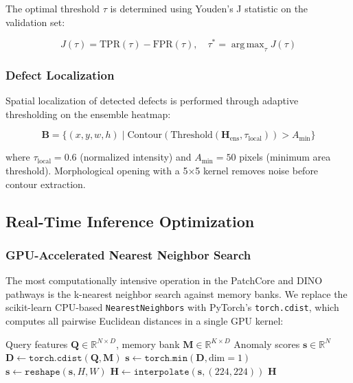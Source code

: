 \documentclass[journal]{IEEEtran}
\DeclareMathOperator*{\argmax}{arg\,max}
\begin{document}
The optimal threshold $\tau$ is determined using Youden's J statistic on the validation set:

\begin{equation}
    J(\tau) = \text{TPR}(\tau) - \text{FPR}(\tau), \quad \tau^* = \argmax_{\tau} J(\tau)
    \label{eq:youden}
\end{equation}

\subsubsection{Defect Localization}

Spatial localization of detected defects is performed through adaptive thresholding on the ensemble heatmap:

\begin{equation}
    \mathbf{B} = \{(x, y, w, h) \;|\; \text{Contour}(\text{Threshold}(\mathbf{H}_{\text{ens}}, \tau_{\text{local}})) > A_{\text{min}}\}
    \label{eq:bboxes}
\end{equation}

where $\tau_{\text{local}} = 0.6$ (normalized intensity) and $A_{\text{min}} = 50$ pixels (minimum area threshold). Morphological opening with a 5$\times$5 kernel removes noise before contour extraction.

\subsection{Real-Time Inference Optimization}

\subsubsection{GPU-Accelerated Nearest Neighbor Search}

The most computationally intensive operation in the PatchCore and DINO pathways is the k-nearest neighbor search against memory banks. We replace the scikit-learn CPU-based \texttt{NearestNeighbors} with PyTorch's \texttt{torch.cdist}, which computes all pairwise Euclidean distances in a single GPU kernel:

\begin{algorithm}[t]
\caption{GPU-Accelerated Batch Anomaly Scoring}
\label{alg:gpu_scoring}
\begin{algorithmic}[1]
\REQUIRE Query features $\mathbf{Q} \in \mathbb{R}^{N \times D}$, memory bank $\mathbf{M} \in \mathbb{R}^{K \times D}$
\ENSURE Anomaly scores $\mathbf{s} \in \mathbb{R}^{N}$
\STATE $\mathbf{D} \gets \texttt{torch.cdist}(\mathbf{Q}, \mathbf{M})$ 
\STATE $\mathbf{s} \gets \texttt{torch.min}(\mathbf{D}, \text{dim}=1)$ 
\STATE $\mathbf{s} \gets \texttt{reshape}(\mathbf{s}, H, W)$ 
\STATE $\mathbf{H} \gets \texttt{interpolate}(\mathbf{s}, (224, 224))$ 
\RETURN $\mathbf{H}$
\end{algorithmic}
\end{algorithm}
\end{document}
